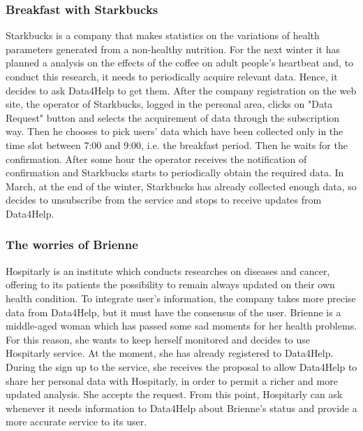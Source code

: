 \documentclass[a4paper]{article}
\begin{document}
\subsubsection{Breakfast with Starkbucks}
Starkbucks is a company that makes statistics on the variations of health parameters generated from a non-healthy nutrition. For the next winter it has planned a analysis on the effects of the coffee on adult people's heartbeat and, to conduct this research, it needs to periodically acquire relevant data. Hence, it decides to ask Data4Help to get them. \newline 
After the company registration on the web site, the operator of Starkbucks, logged in the personal area, clicks on "Data Request" button and selects the acquirement of data through the subscription way. Then he chooses to pick users' data which have been collected only in the time slot between 7:00 and 9:00, i.e. the breakfast period. Then he waits for the confirmation. After some hour the operator receives the notification of confirmation and Starkbucks starts to periodically obtain the required data. \newline
In March, at the end of the winter, Starkbucks has already collected enough data, so decides to unsubscribe from the service and stops to receive updates from Data4Help. 

\subsubsection{The worries of Brienne}
Hospitarly is an institute which conducts researches on diseases and cancer, offering to its patients the possibility to remain always updated on their own health condition. To integrate user's information, the company takes more precise data from Data4Help, but it must have the consensus of the user. \newline
Brienne is a middle-aged woman which has passed some sad moments for her health problems. For this reason, she wants to keep herself monitored and decides to use Hospitarly service. At the moment, she has already registered to Data4Help. \newline
During the sign up to the service, she receives the proposal to allow Data4Help to share her personal data with Hospitarly, in order to permit a richer and more updated analysis. She accepts the request. \newline
From this point, Hospitarly can ask whenever it needs information to Data4Help about Brienne's status and provide a more accurate service to its user.
\end{document}
